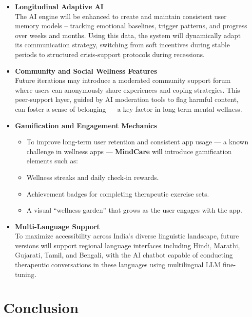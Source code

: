 \documentclass[a4paper,12pt]{report}
\begin{document}
\begin{itemize}
    \item \textbf{Longitudinal Adaptive AI}\\
    The AI engine will be enhanced to create and maintain consistent user memory models -- tracking emotional baselines, trigger patterns, and progress over weeks and months. Using this data, the system will dynamically adapt its communication strategy, switching from soft incentives during stable periods to structured crisis-support protocols during recessions.
    
    \item \textbf{Community and Social Wellness Features}\\
    Future iterations may introduce a moderated community support forum where users can anonymously share experiences and coping strategies. This peer-support layer, guided by AI moderation tools to flag harmful content, can foster a sense of belonging --- a key factor in long-term mental wellness.
    
    \item \textbf{Gamification and Engagement Mechanics}
    \begin{itemize}
        \item To improve long-term user retention and consistent app usage --- a known challenge in wellness apps --- \textbf{MindCare} will introduce gamification elements such as:
        \item Wellness streaks and daily check-in rewards.
        \item Achievement badges for completing therapeutic exercise sets.
        \item A visual ``wellness garden'' that grows as the user engages with the app.
    \end{itemize}
    
    \item \textbf{Multi-Language Support}\\
    To maximize accessibility across India's diverse linguistic landscape, future versions will support regional language interfaces including Hindi, Marathi, Gujarati, Tamil, and Bengali, with the AI chatbot capable of conducting therapeutic conversations in these languages using multilingual LLM fine-tuning.
\end{itemize}

\chapter{Conclusion}
\end{document}
